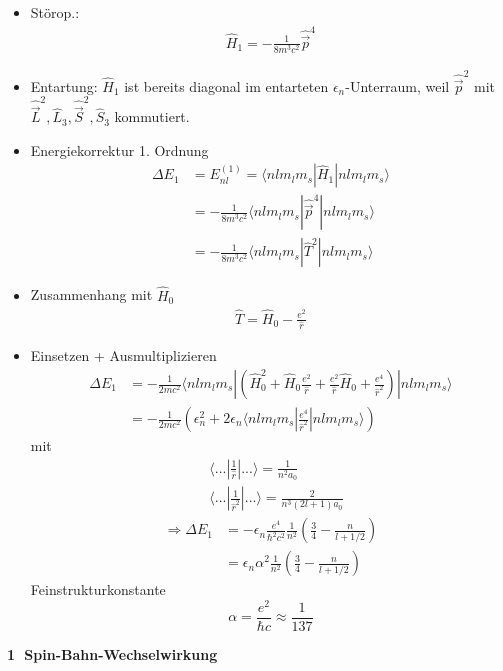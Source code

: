 \documentclass[10pt,article,colorback,accentcolor=tud9d]{scrartcl}
\begin{document}
\begin{itemize}
	\item Störop.:
    \begin{align}
    \hat{H}_1=-\frac{1}{8m^3c^2}\hat{\vec{p}}^4
    \end{align}
  \item Entartung: $\hat{H}_1$ ist bereits diagonal im entarteten $\epsilon_n$-Unterraum, weil $\hat{\vec{p}}^2$ mit $\hat{\vec{L}}^2,\hat{L}_3,\hat{\vec{S}}^2,\hat{S}_3$ kommutiert.
  \item Energiekorrektur 1. Ordnung
    \begin{align}
    \Delta E_1&=E^{(1)}_{nl}=\langle nlm_lm_s|\hat{H}_1|nlm_lm_s\rangle\\
    &=-\frac{1}{8m^3c^2}\langle nlm_lm_s|\hat{\vec{p}}^4|nlm_lm_s\rangle\\
    &=-\frac{1}{8m^3c^2}\langle nlm_lm_s|\hat{T}^2|nlm_lm_s\rangle
    \end{align}
  \item Zusammenhang mit $\hat{H}_0$
    \begin{align}
    \hat{T}=\hat{H}_0-\frac{e^2}{\hat{r}}
    \end{align}
  \item Einsetzen + Ausmultiplizieren
    \begin{align}
    \Delta E_1&=-\frac{1}{2mc^2}\langle nlm_lm_s|\left(\hat{H}_0^2+\hat{H}_0\frac{e^2}{\hat{r}}+\frac{e^2}{\hat{r}}\hat{H}_0+\frac{e^4}{\hat{r}^2}\right)|nlm_lm_s\rangle\\
    &=-\frac{1}{2mc^2}\left(\epsilon_n^2+2\epsilon_n\langle nlm_lm_s|\frac{e^4}{\hat{r}^2}|nlm_lm_s\rangle\right)
    \end{align}
    mit
    \begin{align}
    &\langle...|\frac{1}{\hat{r}}|...\rangle=\frac{1}{n^2a_0}\\
    &\langle...|\frac{1}{\hat{r}^2}|...\rangle=\frac{2}{n^3(2l+1)a_0}
    \end{align}
    \begin{align}
    \Rightarrow \Delta E_1&=-\epsilon_n\frac{e^4}{\hbar^2c^2}\frac{1}{n^2}\left(\frac{3}{4}-\frac{n}{l+1/2}\right)\\
    &=\epsilon_n\alpha^2\frac{1}{n^2}\left(\frac{3}{4}-\frac{n}{l+1/2}\right)
    \end{align}
    Feinstrukturkonstante 
    $$
    \alpha=\frac{e^2}{\hbar c}\approx \frac{1}{137}
    $$
\end{itemize}
\noindent\textbf{\textcircled{1} Spin-Bahn-Wechselwirkung}
\end{document}
